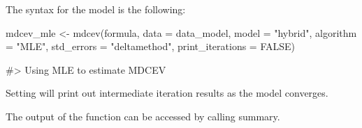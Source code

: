 The syntax for the model is the following:

\begin{Schunk}
\begin{Sinput}
mdcev_mle <- mdcev(formula,
                  data = data_model,
                  model = "hybrid",
                  algorithm = "MLE",
                  std_errors = "deltamethod",
                  print_iterations = FALSE)
\end{Sinput}
\begin{Soutput}
#> Using MLE to estimate MDCEV
\end{Soutput}
\end{Schunk}

Setting  will print out intermediate
iteration results as the model converges.

The output of the function can be accessed by calling summary.

